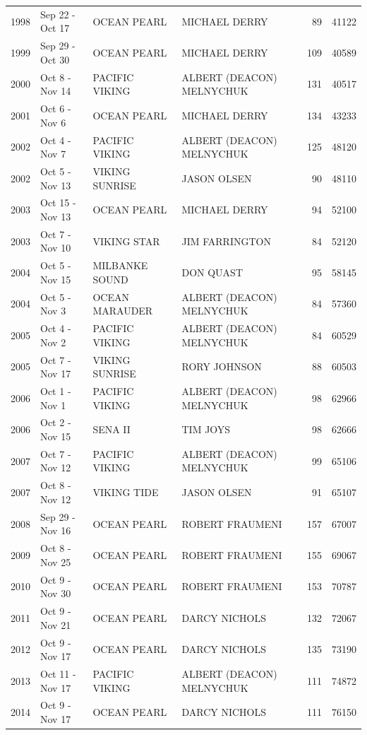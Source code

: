 \documentclass[12pt]{article}\usepackage[]{graphicx}\usepackage[]{color}
\begin{document}
\begin{appendices}
\begin{longtable}{rlllrr}
1998 & Sep 22  - Oct 17 & OCEAN PEARL & MICHAEL DERRY & 89 & 41122\\
1999 & Sep 29  - Oct 30 & OCEAN PEARL & MICHAEL DERRY & 109 & 40589\\
2000 & Oct  8  - Nov 14 & PACIFIC VIKING & ALBERT (DEACON) MELNYCHUK & 131 & 40517\\
2001 & Oct  6  - Nov  6 & OCEAN PEARL & MICHAEL DERRY & 134 & 43233\\
2002 & Oct  4  - Nov  7 & PACIFIC VIKING & ALBERT (DEACON) MELNYCHUK & 125 & 48120\\
2002 & Oct  5  - Nov 13 & VIKING SUNRISE & JASON OLSEN & 90 & 48110\\
2003 & Oct 15  - Nov 13 & OCEAN PEARL & MICHAEL DERRY & 94 & 52100\\
2003 & Oct  7  - Nov 10 & VIKING STAR & JIM FARRINGTON & 84 & 52120\\
2004 & Oct  5  - Nov 15 & MILBANKE SOUND & DON QUAST & 95 & 58145\\
2004 & Oct  5  - Nov  3 & OCEAN MARAUDER & ALBERT (DEACON) MELNYCHUK & 84 & 57360\\
2005 & Oct  4  - Nov  2 & PACIFIC VIKING & ALBERT (DEACON) MELNYCHUK & 84 & 60529\\
2005 & Oct  7  - Nov 17 & VIKING SUNRISE & RORY JOHNSON & 88 & 60503\\
2006 & Oct  1  - Nov  1 & PACIFIC VIKING & ALBERT (DEACON) MELNYCHUK & 98 & 62966\\
2006 & Oct  2  - Nov 15 & SENA II & TIM JOYS & 98 & 62666\\
2007 & Oct  7  - Nov 12 & PACIFIC VIKING & ALBERT (DEACON) MELNYCHUK & 99 & 65106\\
2007 & Oct  8  - Nov 12 & VIKING TIDE & JASON OLSEN & 91 & 65107\\
2008 & Sep 29  - Nov 16 & OCEAN PEARL & ROBERT FRAUMENI & 157 & 67007\\
2009 & Oct  8  - Nov 25 & OCEAN PEARL & ROBERT FRAUMENI & 155 & 69067\\
2010 & Oct  9  - Nov 30 & OCEAN PEARL & ROBERT FRAUMENI & 153 & 70787\\
2011 & Oct  9  - Nov 21 & OCEAN PEARL & DARCY NICHOLS & 132 & 72067\\
2012 & Oct  9  - Nov 17 & OCEAN PEARL & DARCY NICHOLS & 135 & 73190\\
2013 & Oct 11  - Nov 17 & PACIFIC VIKING & ALBERT (DEACON) MELNYCHUK & 111 & 74872\\
2014 & Oct  9  - Nov 17 & OCEAN PEARL & DARCY NICHOLS & 111 & 76150\\

\end{longtable}
\end{appendices}
\end{document}
